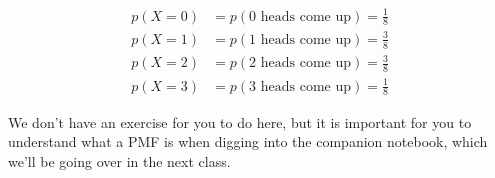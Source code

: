 \documentclass[assignment01_Solutions]{subfiles}
\begin{document}
\begin{align}
p(X=0) &= p(\mbox{0 heads come up}) = \frac{1}{8} \nonumber \\
p(X=1) &= p(\mbox{1 heads come up}) = \frac{3}{8} \nonumber \\
p(X=2) &= p(\mbox{2 heads come up}) = \frac{3}{8} \nonumber \\
p(X=3) &= p(\mbox{3 heads come up}) = \frac{1}{8} \nonumber 
\end{align}

We don't have an exercise for you to do here, but it is important for you to understand what a PMF is when digging into the companion notebook, which we'll be going over in the next class.
\end{document}
